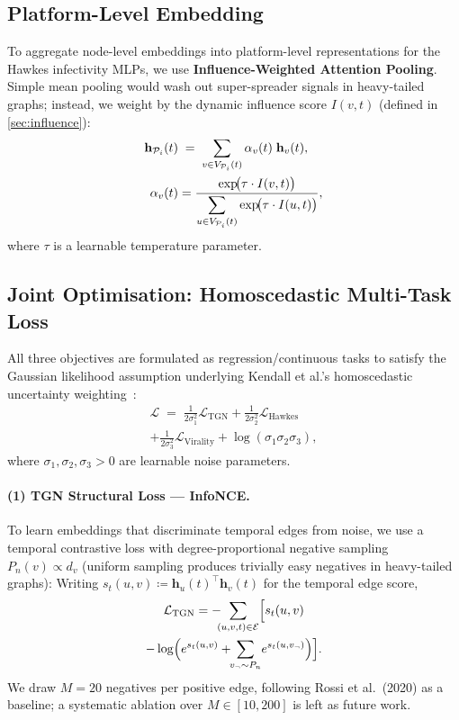 \documentclass[11pt]{article}
\newcommand{\hv}{\mathbf{h}}
\newcommand{\cE}{\mathcal{E}}
\newcommand{\cP}{\mathcal{P}}
\begin{document}
\subsection{Platform-Level Embedding}
\label{sec:platform-emb}

To aggregate node-level embeddings into platform-level representations for the
Hawkes infectivity MLPs, we use \textbf{Influence-Weighted Attention Pooling}.
Simple mean pooling would wash out super-spreader signals in heavy-tailed graphs;
instead, we weight by the dynamic influence score $I(v,t)$
(defined in \cref{sec:influence}):
\begin{align}
  \hv_{\cP_i}(t) &\;=\;
  \sum_{v\in V_{\cP_i}(t)}
  \alpha_v(t)\;\hv_v(t),
  \notag \\
  \alpha_v(t) &= \frac{
    \exp\!\bigl(\tau\cdot I(v,t)\bigr)
  }{
    \displaystyle\sum_{u\in V_{\cP_i}(t)}
    \exp\!\bigl(\tau\cdot I(u,t)\bigr)
  },
  \label{eq:platform-emb}
\end{align}
where $\tau$ is a learnable temperature parameter.

\subsection{Joint Optimisation: Homoscedastic Multi-Task Loss}
\label{sec:loss}

All three objectives are formulated as regression/continuous tasks to satisfy
the Gaussian likelihood assumption underlying Kendall et al.'s homoscedastic
uncertainty weighting~\citep{kendall2018multi}:
\begin{multline}
  \mathcal{L}
  \;=\;
  \frac{1}{2\sigma_1^2}\mathcal{L}_{\mathrm{TGN}}
  + \frac{1}{2\sigma_2^2}\mathcal{L}_{\mathrm{Hawkes}} \\
  + \frac{1}{2\sigma_3^2}\mathcal{L}_{\mathrm{Virality}}
  + \log(\sigma_1\sigma_2\sigma_3),
  \label{eq:joint-loss}
\end{multline}
where $\sigma_1,\sigma_2,\sigma_3 > 0$ are learnable noise parameters.

\paragraph{(1) TGN Structural Loss --- InfoNCE.}
To learn embeddings that discriminate temporal edges from noise, we use a
temporal contrastive loss with degree-proportional negative sampling
$P_n(v)\propto d_v$ (uniform sampling produces trivially easy negatives in
heavy-tailed graphs):
Writing $s_t(u,v) \coloneqq \hv_u(t)^\top \hv_v(t)$ for the temporal edge
score,
\begin{multline}
  \mathcal{L}_{\mathrm{TGN}}
  = -\!\!\!\sum_{(u,v,t)\in\cE}
  \Bigl[ s_t(u,v) \\
  - \log\Bigl(
    e^{s_t(u,v)}
    +\!\!\sum_{v_{\neg}\sim P_n}\! e^{s_t(u,v_{\neg})}
  \Bigr) \Bigr].
  \label{eq:info-nce}
\end{multline}
We draw $M=20$ negatives per positive edge, following Rossi et al.~(2020) as a
baseline; a systematic ablation over $M\in[10,200]$ is left as future work.
\end{document}
